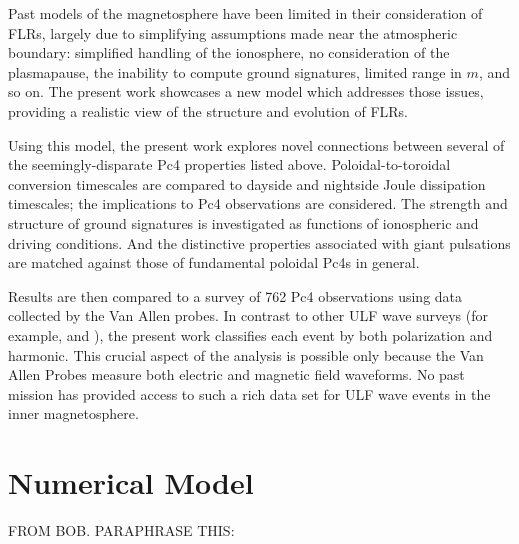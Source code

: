 \documentclass[draft,linenumbers]{agujournal}
\begin{document}
Past models of the magnetosphere have been limited in their consideration of FLRs, largely due to simplifying assumptions made near the atmospheric boundary: simplified handling of the ionosphere, no consideration of the plasmapause, the inability to compute ground signatures, limited range in $m$, and so on. The present work showcases a new model which addresses those issues, providing a realistic view of the structure and evolution of FLRs.

Using this model, the present work explores novel connections between several of the seemingly-disparate Pc4 properties listed above. Poloidal-to-toroidal conversion timescales are compared to dayside and nightside Joule dissipation timescales; the implications to Pc4 observations are considered. The strength and structure of ground signatures is investigated as functions of ionospheric and driving conditions. And the distinctive properties associated with giant pulsations are matched against those of fundamental poloidal Pc4s in general.

Results are then compared to a survey of 762 Pc4 observations using data collected by the Van Allen probes. In contrast to other ULF wave surveys (for example, \citet{dai_2015} and \citet{motoba_2015}), the present work classifies each event by both polarization and harmonic. This crucial aspect of the analysis is possible only because the Van Allen Probes measure both electric and magnetic field waveforms. No past mission has provided access to such a rich data set for ULF wave events in the inner magnetosphere.



\section{Numerical Model}











FROM BOB. PARAPHRASE THIS:
\end{document}
